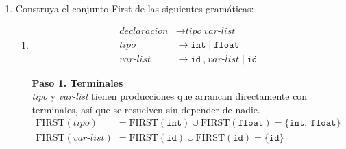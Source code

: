 \documentclass[12pt,letterpaper]{article}
\newcommand{\nt}[1]{\textit{#1}}
\newcommand{\tk}[1]{\texttt{#1}}
\newcommand{\First}[1]{\mathrm{FIRST}(#1)}
\begin{document}
\begin{enumerate}[label=\arabic*.]
\begin{itemize}
    \textbf{Paso 4. \nt{S}}\\
    La producción es
    \[
    \nt{S} \to \nt{A}\ \nt{B}
    \]
    
    Es una concatenación simple, el $\mathrm{FIRST}$ de \nt{S} empieza con el $\mathrm{FIRST}$ de \nt{A}, pero
    como \nt{A} es anulable, también hay que agregar el $\mathrm{FIRST}$ de \nt{B}, el símbolo que le sigue:
    \[
    \begin{aligned}
      \First{\nt{S}}
      &= \First{\nt{A}} \cup \First{\nt{B}} \quad \text{(porque \nt{A} es anulable)}\\
      &= \{\tk{begin}\} \cup \{\tk{var},\ \tk{fvar}\} \\
      &= \{\tk{begin},\ \tk{var},\ \tk{fvar}\}
    \end{aligned}
    \]

    \textbf{Respuesta final}
    \[
    \begin{aligned}
      \First{\nt{S}} &= \{\tk{begin},\ \tk{var},\ \tk{fvar}\} \\
      \First{\nt{A}} &= \{\tk{begin}\} \\
      \First{\nt{B}} &= \{\tk{var},\ \tk{fvar}\} \\
      \First{\nt{L}} &= \{\tk{id}\}
    \end{aligned}
    \]
    
  \end{itemize}

  
\newpage

\item Construya el conjunto First de las siguientes gramáticas:

  \begin{enumerate}[label=\alph*.]
  \item
    
    \[
    \begin{aligned}
      \nt{declaracion} &\to \nt{tipo}\ \nt{var-list} \\
      \nt{tipo}        &\to \tk{int} \mid \tk{float} \\
      \nt{var-list}    &\to \tk{id}\ \tk{,}\ \nt{var-list} \mid \tk{id}
    \end{aligned}
    \]

    \textbf{Paso 1. Terminales}\\
    \nt{tipo} y \nt{var-list} tienen producciones que arrancan directamente con terminales, así que se resuelven
    sin depender de nadie.
    \[
    \begin{aligned}
      \First{\nt{tipo}}
      &= \First{\tk{int}} \cup \First{\tk{float}}
      = \{\tk{int},\ \tk{float}\} \\[2pt]
      \First{\nt{var-list}}
      &= \First{\tk{id}} \cup \First{\tk{id}}
      = \{\tk{id}\}
    \end{aligned}
    \]
    

\end{enumerate}
\end{enumerate}
\end{document}
